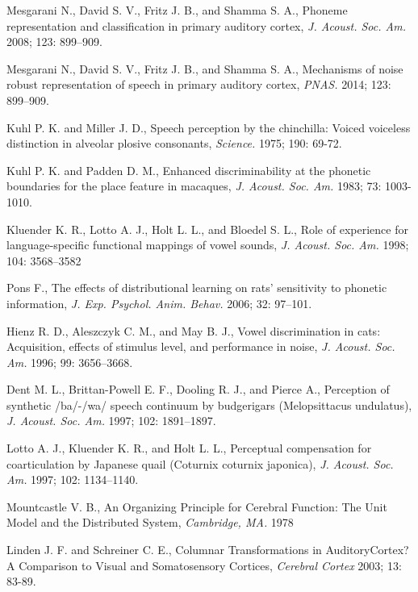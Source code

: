 \documentclass[11pt,a4paper]{article}
\begin{document}
\begin{thebibliography}{9}

  Mesgarani N., David S. V., Fritz J. B., and Shamma S. A.,
  Phoneme representation and classification in primary auditory cortex,
  \emph{J. Acoust. Soc. Am.} 2008; 123: 899–909.

  Mesgarani N., David S. V., Fritz J. B., and Shamma S. A.,
  Mechanisms of noise robust representation of speech in primary auditory cortex,
  \emph{PNAS.} 2014; 123: 899–909.

  Kuhl P. K. and Miller J. D.,
  Speech perception by the chinchilla: Voiced voiceless distinction in alveolar plosive consonants,
  \emph{Science.} 1975; 190: 69-72.

  Kuhl P. K. and Padden D. M.,
  Enhanced discriminability at the phonetic boundaries for the place feature in macaques,
  \emph{J. Acoust. Soc. Am.} 1983; 73: 1003-1010.

  Kluender K. R., Lotto A. J., Holt L. L., and Bloedel S. L.,
  Role of experience for language-specific functional mappings of vowel sounds,
  \emph{J. Acoust. Soc. Am.} 1998; 104: 3568–3582

  Pons F.,
  The effects of distributional learning on rats’ sensitivity to phonetic information,
  \emph{J. Exp. Psychol. Anim. Behav.} 2006; 32: 97–101.

  Hienz R. D., Aleszczyk C. M., and May B. J.,
  Vowel discrimination in cats: Acquisition, effects of stimulus level, and performance in noise,
  \emph{J. Acoust. Soc. Am.} 1996; 99: 3656–3668.

  Dent M. L., Brittan-Powell E. F., Dooling R. J., and Pierce A.,
  Perception of synthetic /ba/-/wa/ speech continuum by budgerigars (Melopsittacus undulatus),
  \emph{J. Acoust. Soc. Am.} 1997; 102: 1891–1897.

  Lotto A. J., Kluender K. R., and Holt L. L.,
  Perceptual compensation for coarticulation by Japanese quail (Coturnix coturnix japonica),
  \emph{J. Acoust. Soc. Am.} 1997; 102: 1134–1140.

  Mountcastle V. B.,
  An Organizing Principle for Cerebral Function: The Unit Model and the Distributed System,
  \emph{Cambridge, MA.} 1978

  Linden J. F. and Schreiner C. E.,
  Columnar Transformations in AuditoryCortex? A Comparison to Visual and Somatosensory Cortices,
  \emph{Cerebral Cortex} 2003; 13: 83-89.


\end{thebibliography}
\end{document}
